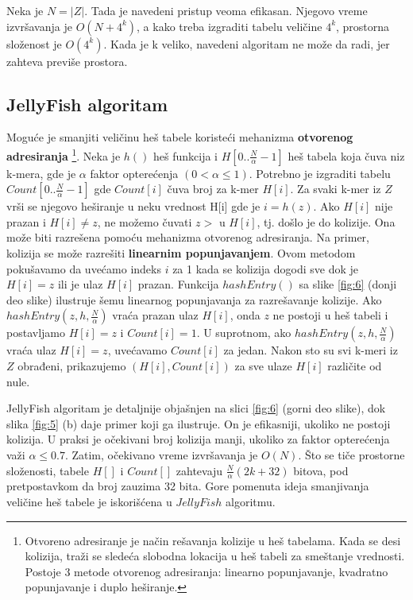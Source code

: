 \documentclass[12pt,oneside]{memoir}
\begin{document}
Neka je $N = |Z|$. Tada je navedeni pristup veoma efikasan. Njegovo vreme izvršavanja je $O(N + 4^k)$, a kako treba izgraditi tabelu veličine $4^k$, prostorna složenost je $O(4^k)$. Kada je k veliko, navedeni algoritam ne može da radi, jer zahteva previše prostora.

\subsection{JellyFish algoritam}
Moguće je smanjiti veličinu heš tabele koristeći mehanizma \textbf{otvorenog adresiranja} \footnote{Otvoreno adresiranje je način rešavanja kolizije u heš tabelama. Kada se desi kolizija, traži se sledeća slobodna lokacija u heš tabeli za smeštanje vrednosti. Postoje 3 metode otvorenog adresiranja: linearno popunjavanje, kvadratno popunjavanje i duplo heširanje.}. Neka je $h()$ heš funkcija i $H[0..\frac{N}{\alpha} - 1]$ heš tabela koja čuva niz k-mera, gde je $\alpha$ faktor opterećenja $(0 < \alpha \leq 1)$. Potrebno je izgraditi tabelu $Count[0..\frac{N}{\alpha} - 1]$ gde $Count[i]$ čuva broj za k-mer $H[i]$. Za svaki k-mer iz $Z$ vrši se njegovo  heširanje u neku vrednost H[i] gde je $i = h(z)$. Ako $H[i]$ nije prazan i $H[i] \neq z$, ne možemo čuvati $z>$ u $H[i]$, tj. došlo je do kolizije. Ona može biti razrešena pomoću mehanizma otvorenog adresiranja. Na primer, kolizija se može razrešiti \textbf{linearnim popunjavanjem}. Ovom metodom pokušavamo da uvećamo indeks $i$ za 1 kada se kolizija dogodi sve dok je $H[i] = z$ ili je ulaz $H[i]$ prazan. Funkcija $hashEntry()$ sa slike \ref{fig:6} (donji deo slike) ilustruje šemu linearnog popunjavanja za razrešavanje kolizije. Ako $hashEntry(z, h, \frac{N}{\alpha})$ vraća prazan ulaz $H[i]$, onda $z$ ne postoji u heš tabeli i postavljamo $H[i] = z$ i $Count[i] = 1$. U suprotnom, ako $hashEntry(z, h, \frac{N}{\alpha})$ vraća ulaz $H[i] = z$, uvećavamo $Count[i]$ za jedan. Nakon sto su svi k-meri iz $Z$ obrađeni, prikazujemo $(H[i], Count[i])$ za sve ulaze $H[i]$ različite od nule.

JellyFish algoritam je detaljnije objašnjen na slici \ref{fig:6} (gorni deo slike), dok slika \ref{fig:5} (b) daje primer koji ga ilustruje. On je efikasniji, ukoliko ne postoji kolizija. U praksi je očekivani broj kolizija manji, ukoliko za faktor opterećenja važi $\alpha \leq 0.7$. Zatim, očekivano vreme izvršavanja je $O(N)$. Što se tiče prostorne složenosti, tabele $H[]$ i $Count[]$ zahtevaju $\frac{N}{\alpha}(2k + 32)$ bitova, pod pretpostavkom da broj zauzima 32 bita. Gore pomenuta ideja smanjivanja veličine heš tabele je iskorišćena u $JellyFish$ algoritmu.
\end{document}
